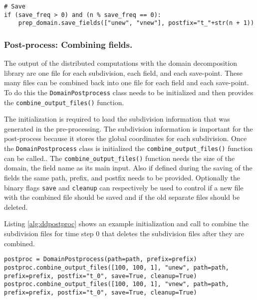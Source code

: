 \begin{lstlisting}[caption={Example code for calling to save two fields during time stepping using the domain decomposition library},captionpos=b, label={alg:ddsave}, float, floatplacement=H]
# Save
if (save_freq > 0) and (n % save_freq == 0):
    prep_domain.save_fields(["unew", "vnew"], postfix="t_"+str(n + 1))
\end{lstlisting}

\subsubsection{Post-process: Combining fields.}
The output of the distributed computations with the domain decomposition library are one file for each subdivision, each field, and each save-point.
These many files can be combined back into one file for each field and each save-point.
To do this the \texttt{DomainPostprocess} class needs to be initialized and then provides the \texttt{combine\_output\_files()} function.

The initialization is required to load the subdivision information that was generated in the pre-processing.
The subdivision information is important for the post-process because it stores the global coordinates for each subdivision.
Once the \texttt{DomainPostprocess} class is initialized the \texttt{combine\_output\_files()} function can be called..
The \texttt{combine\_output\_files()} function needs the size of the domain, the field name as its main input.
Also if defined during the saving of the fields the same path, prefix, and postfix needs to be provided.
Optionally the binary flags \texttt{save} and \texttt{cleanup} can respectively be used to control if a new file with the combined file should be saved and if the old separate files should be deleted.

Listing \ref{alg:ddpostproc} shows an example initialization and call to combine the subdivision files for time step 0 that deletes the subdivision files after they are combined.

\begin{lstlisting}[caption={Example post-processing.}, captionpos=b, label={alg:ddpostproc}, float, floatplacement=H]
postproc = DomainPostprocess(path=path, prefix=prefix)
postproc.combine_output_files([100, 100, 1], "unew", path=path, prefix=prefix, postfix="t_0", save=True, cleanup=True)
postproc.combine_output_files([100, 100, 1], "vnew", path=path, prefix=prefix, postfix="t_0", save=True, cleanup=True)
\end{lstlisting}

